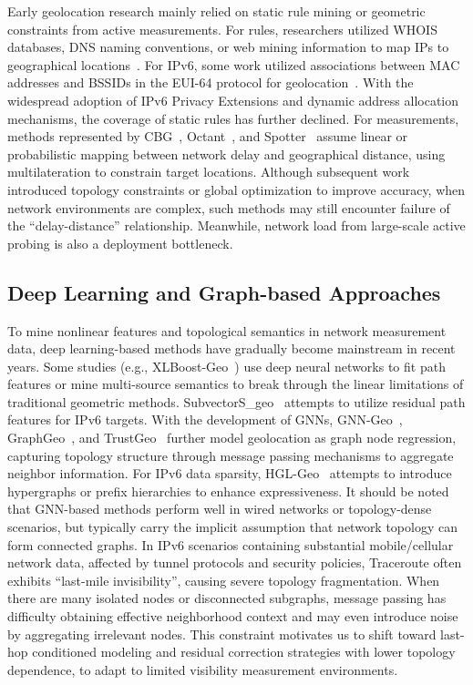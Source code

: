 \documentclass[runningheads]{llncs}
\begin{document}
Early geolocation research mainly relied on static rule mining or geometric constraints from active measurements. For rules, researchers utilized WHOIS databases, DNS naming conventions, or web mining information to map IPs to geographical locations~\cite{Padmanabhan01,Dan22,Guo09}. For IPv6, some work utilized associations between MAC addresses and BSSIDs in the EUI-64 protocol for geolocation~\cite{IPvSeeYou23,IPv6Landmarker25}. With the widespread adoption of IPv6 Privacy Extensions and dynamic address allocation mechanisms, the coverage of static rules has further declined. For measurements, methods represented by CBG~\cite{CBG04}, Octant~\cite{Octant07}, and Spotter~\cite{Spotter11} assume linear or probabilistic mapping between network delay and geographical distance, using multilateration to constrain target locations. Although subsequent work~\cite{KatzBassett06,Chen18,Hu12,Zhang20} introduced topology constraints or global optimization to improve accuracy, when network environments are complex, such methods may still encounter failure of the ``delay-distance'' relationship. Meanwhile, network load from large-scale active probing is also a deployment bottleneck.

\subsection{Deep Learning and Graph-based Approaches}

To mine nonlinear features and topological semantics in network measurement data, deep learning-based methods have gradually become mainstream in recent years. Some studies (e.g., XLBoost-Geo~\cite{XLBoost20}) use deep neural networks to fit path features or mine multi-source semantics to break through the linear limitations of traditional geometric methods. SubvectorS\_geo~\cite{SubvectorS23} attempts to utilize residual path features for IPv6 targets. With the development of GNNs, GNN-Geo~\cite{GNNGeo23}, GraphGeo~\cite{GraphGeo22}, and TrustGeo~\cite{TrustGeo23} further model geolocation as graph node regression, capturing topology structure through message passing mechanisms to aggregate neighbor information. For IPv6 data sparsity, HGL-Geo~\cite{HGLGeo23} attempts to introduce hypergraphs or prefix hierarchies to enhance expressiveness. It should be noted that GNN-based methods perform well in wired networks or topology-dense scenarios, but typically carry the implicit assumption that network topology can form connected graphs. In IPv6 scenarios containing substantial mobile/cellular network data, affected by tunnel protocols and security policies, Traceroute often exhibits ``last-mile invisibility'', causing severe topology fragmentation. When there are many isolated nodes or disconnected subgraphs, message passing has difficulty obtaining effective neighborhood context and may even introduce noise by aggregating irrelevant nodes. This constraint motivates us to shift toward last-hop conditioned modeling and residual correction strategies with lower topology dependence, to adapt to limited visibility measurement environments.
\end{document}

